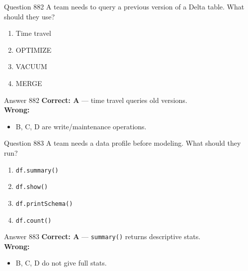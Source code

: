 \documentclass[aspectratio=169,11pt]{beamer}
\begin{document}
	\begin{frame}{Question 882}
		A team needs to query a previous version of a Delta table. What should they use?
		\begin{enumerate}[label=\Alph*.]
			\item Time travel
			\item OPTIMIZE
			\item VACUUM
			\item MERGE
		\end{enumerate}
	\end{frame}
	\begin{frame}{Answer 882}
		\textbf{Correct: A} --- time travel queries old versions.\\
		\vspace{0.5em}
		\textbf{Wrong:}
		\begin{itemize}
			\item B, C, D are write/maintenance operations.
		\end{itemize}
	\end{frame}
	
	\begin{frame}{Question 883}
		A team needs a data profile before modeling. What should they run?
		\begin{enumerate}[label=\Alph*.]
			\item \texttt{df.summary()}
			\item \texttt{df.show()}
			\item \texttt{df.printSchema()}
			\item \texttt{df.count()}
		\end{enumerate}
	\end{frame}
	\begin{frame}{Answer 883}
		\textbf{Correct: A} --- \texttt{summary()} returns descriptive stats.\\
		\vspace{0.5em}
		\textbf{Wrong:}
		\begin{itemize}
			\item B, C, D do not give full stats.
		\end{itemize}
	\end{frame}
	
\end{document}

